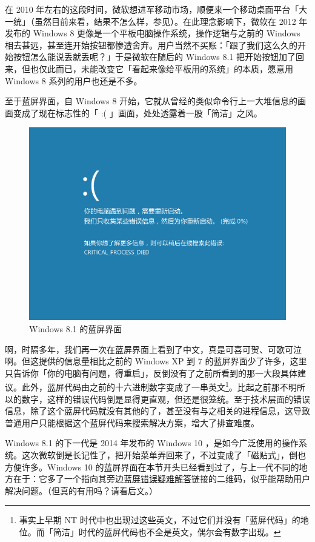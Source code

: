 在 2010 年左右的这段时间，微软想进军移动市场，顺便来一个移动桌面平台「大一统」（虽然目前来看，结果不怎么样，参见）。在此理念影响下，微软在 2012 年发布的 Windows 8 更像是一个平板电脑操作系统，操作逻辑与之前的 Windows 相去甚远，甚至连开始按钮都惨遭舍弃。用户当然不买账：「跟了我们这么久的开始按钮怎么能说丢就丢呢？」于是微软在随后的 Windows 8.1 把开始按钮加了回来，但也仅此而已，未能改变它「看起来像给平板用的系统」的本质，愿意用 Windows 8 系列的用户也还是不多。

至于蓝屏界面，自 Windows 8 开始，它就从曾经的类似命令行上一大堆信息的画面变成了现在标志性的「 :( 」画面，处处透露着一股「简洁」之风。

\begin{figure}[htb!]
  \centering
  \includegraphics[width=.6\textwidth]{assets/advanced/Win-8.1-BSoD.png}
  \caption{Windows 8.1 的蓝屏界面}
  \label{fig:Win-8.1-BSoD}
\end{figure}

啊，时隔多年，我们再一次在蓝屏界面上看到了中文，真是可喜可贺、可歌可泣啊。但这提供的信息量相比之前的 Windows XP 到 7 的蓝屏界面少了许多，这里只告诉你「你的电脑有问题，得重启」，反倒没有了之前所看到的那一大段具体建议。此外，蓝屏代码由之前的十六进制数字变成了一串英文\footnote{事实上早期 NT 时代中也出现过这些英文，不过它们并没有「蓝屏代码」的地位。而「简洁」时代的蓝屏代码也不全是英文，偶尔会有数字出现。}。比起之前那不明所以的数字，这样的错误代码倒是显得更直观，但还是很笼统。至于技术层面的错误信息，除了这个蓝屏代码就没有其他的了，甚至没有与之相关的进程信息，这导致普通用户只能根据这个蓝屏代码来搜索解决方案，增大了排查难度。

Windows 8.1 的下一代是 2014 年发布的 Windows 10 ，是如今广泛使用的操作系统。这次微软倒是长记性了，把开始菜单弄回来了，不过变成了「磁贴式」，倒也方便许多。Windows 10 的蓝屏界面在本节开头已经看到过了，与上一代不同的地方在于：它多了一个指向其旁边\href{https://www.windows.com/stopcode}{蓝屏错误疑难解答}链接的二维码，似乎能帮助用户解决问题。（但真的有用吗？请看后文。）

